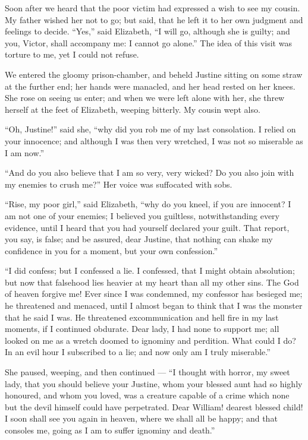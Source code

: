 Soon after we heard that the poor
victim had expressed a wish to see my
cousin. My father wished her not to
go; but said, that he left it to her own
judgment and feelings to decide.
``Yes,'' said Elizabeth, ``I will go,
although she is guilty; and you, Victor,
shall accompany me: I cannot go alone.''
The idea of this visit was torture to
me, yet I could not refuse.

We entered the gloomy prison-chamber,
and beheld Justine sitting on some
straw at the further end; her hands
were manacled, and her head rested on
her knees. She rose on seeing us enter;
and when we were left alone with
her, she threw herself at the feet of
Elizabeth, weeping bitterly. My cousin
wept also.

``Oh, Justine!'' said she, ``why did
you rob me of my last consolation. I
relied on your innocence; and although
I was then very wretched, I was
not so miserable as I am now.''

``And do you also believe that I am
so very, very wicked? Do you also
join with my enemies to crush me?''
Her voice was suffocated with sobs.

``Rise, my poor girl,'' said Elizabeth,
``why do you kneel, if you are
innocent? I am not one of your enemies;
I believed you guiltless, notwithstanding
every evidence, until I heard
that you had yourself declared your
guilt. That report, you say, is false;
and be assured, dear Justine, that nothing
can shake my confidence in you
for a moment, but your own confession.''

``I did confess; but I confessed a
lie. I confessed, that I might obtain
absolution; but now that falsehood lies
heavier at my heart than all my other
sins. The God of heaven forgive me!
Ever since I was condemned, my confessor
has besieged me; he threatened
and menaced, until I almost began to
think that I was the monster that he
said I was. He threatened excommunication
and hell fire in my last moments,
if I continued obdurate. Dear
lady, I had none to support me; all
looked on me as a wretch doomed to
ignominy and perdition. What could
I do? In an evil hour I subscribed to
a lie; and now only am I truly miserable.''

She paused, weeping, and then continued --- ``I
thought with horror, my
sweet lady, that you should believe
your Justine, whom your blessed aunt
had so highly honoured, and whom
you loved, was a creature capable of a
crime which none but the devil himself
could have perpetrated. Dear William!
dearest blessed child! I soon
shall see you again in heaven, where
we shall all be happy; and that consoles
me, going as I am to suffer ignominy
and death.''

